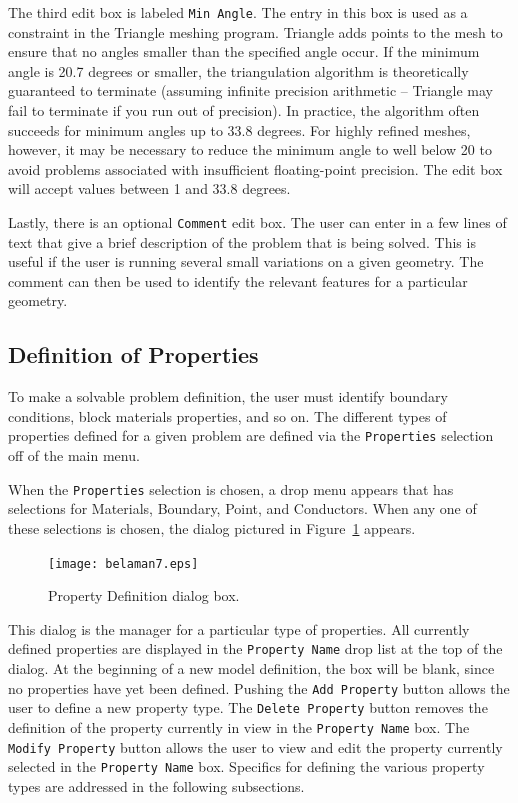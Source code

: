 \documentclass[12pt]{report}
\begin{document}
The third edit box is labeled {\tt Min Angle}.  The entry in this box is used as a
constraint in the Triangle meshing program.  Triangle adds points to the mesh to
ensure that no angles smaller than the specified angle occur. If the minimum angle
is 20.7 degrees or smaller, the triangulation algorithm is theoretically guaranteed to
terminate (assuming infinite precision arithmetic -- Triangle may
fail to terminate if you run out of precision).  In practice, the
algorithm often succeeds for minimum angles up to 33.8 degrees.
For highly refined meshes, however, it may be necessary to reduce
the minimum angle to well below 20 to avoid problems associated
with insufficient floating-point precision.  The edit box will accept
values between 1 and 33.8 degrees.

Lastly, there is an optional \texttt{Comment} edit box. The user
can enter in a few lines of text that give a brief description of
the problem that is being solved. This is useful if the user is
running several small variations on a given geometry. The comment
can then be used to identify the relevant features for a particular
geometry.

\subsection{Definition of Properties}

To make a solvable problem definition, the user must identify boundary
conditions, block materials properties, and so on. The different types of
properties defined for a given problem are defined via the
\texttt{Properties} selection off of the main menu.

When the \texttt{Properties} selection is chosen, a drop menu
appears that has selections for Materials, Boundary, Point, and
Conductors. When any one of these selections is chosen, the dialog
pictured in Figure~\ref{fig7} appears.

\begin{figure}[htbp]
\centerline{\texttt{[image: belaman7.eps]}}
\caption{Property Definition dialog box.}
\label{fig7}
\end{figure}




This dialog is the manager for a particular type of properties. All
currently defined properties are displayed in the \texttt{Property
Name} drop list at the top of the dialog. At the beginning of a new
model definition, the box will be blank, since no properties have
yet been defined. Pushing the \texttt{Add Property} button allows
the user to define a new property type. The \texttt{Delete
Property} button removes the definition of the property currently
in view in the \texttt{Property Name} box. The \texttt{Modify
Property} button allows the user to view and edit the property
currently selected in the \texttt{Property Name} box. Specifics for
defining the various property types are addressed in the
following subsections.
\end{document}
